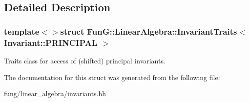 \subsection{Detailed Description}
\subsubsection*{template$<$$>$struct Fun\-G\-::\-Linear\-Algebra\-::\-Invariant\-Traits$<$ Invariant\-::\-P\-R\-I\-N\-C\-I\-P\-A\-L $>$}

Traits class for access of (shifted) principal invariants. 

The documentation for this struct was generated from the following file\-:\begin{DoxyCompactItemize}
\item 
fung/linear\-\_\-algebra/invariants.\-hh\end{DoxyCompactItemize}
